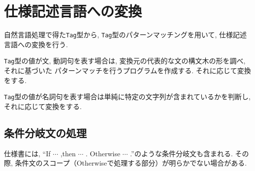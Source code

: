 \documentclass[10pt,twocolumn,uplatex,a4j]{jsreport}
\begin{document}
\section{仕様記述言語への変換}
自然言語処理で得た\texttt{Tag}型から, 
\texttt{Tag}型のパターンマッチングを用いて, 仕様記述言語への変換を行う. 

\texttt{Tag}型の値が文, 動詞句を表す場合は, 
変換元の代表的な文の構文木の形を調べ, それに基づいた %
パターンマッチを行うプログラムを作成する. それに応じて変換をする. 

\texttt{Tag}型の値が名詞句を表す場合は単純に特定の文字列が含まれているかを判断し, それに応じて変換をする. 

\subsection*{条件分岐文の処理}
仕様書には, ``If $\cdots$ ,then $\cdots$ . Otherwise $\cdots$ .''のような条件分岐文も含まれる. 
その際, 条件文のスコープ（Otherwiseで処理する部分）が明らかでない場合がある. %
\end{document}
